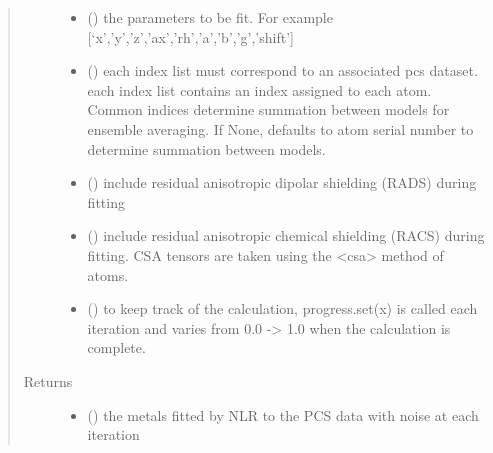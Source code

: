 \documentclass[a4paper,10pt,english,openany,oneside]{sphinxmanual}
\begin{document}
\begin{fulllineitems}
\begin{quote}
\begin{description}
\begin{itemize}
\item {} 
 () \textendash{} the parameters to be fit.
For example {[}‘x’,’y’,’z’,’ax’,’rh’,’a’,’b’,’g’,’shift’{]}

\item {} 
 (\sphinxstyleliteralemphasis{\sphinxupquote{, }}) \textendash{} each index list must correspond to an associated pcs dataset.
each index list contains an index assigned to each atom.
Common indices determine summation between models
for ensemble averaging.
If None, defaults to atom serial number to determine summation
between models.

\item {} 
 (\sphinxstyleliteralemphasis{\sphinxupquote{, }}) \textendash{} include residual anisotropic dipolar shielding (RADS) during fitting

\item {} 
 (\sphinxstyleliteralemphasis{\sphinxupquote{, }}) \textendash{} include residual anisotropic chemical shielding (RACS) during fitting.
CSA tensors are taken using the \textless{}csa\textgreater{} method of atoms.

\item {} 
 (\sphinxstyleliteralemphasis{\sphinxupquote{, }}) \textendash{} to keep track of the calculation, progress.set(x) is called each
iteration and varies from 0.0 -\textgreater{} 1.0 when the calculation is complete.

\end{itemize}

\item[{Returns}] \leavevmode
\begin{itemize}
\item {} 
 () \textendash{} the metals fitted by NLR to the PCS data with noise at each iteration


\end{itemize}
\end{description}
\end{quote}
\end{fulllineitems}
\end{document}
